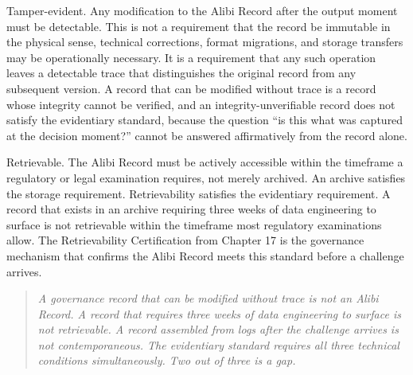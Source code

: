 Tamper-evident. Any modification to the Alibi Record after the output moment must be detectable. This is not a requirement that the record be immutable in the physical sense, technical corrections, format migrations, and storage transfers may be operationally necessary. It is a requirement that any such operation leaves a detectable trace that distinguishes the original record from any subsequent version. A record that can be modified without trace is a record whose integrity cannot be verified, and an integrity-unverifiable record does not satisfy the evidentiary standard, because the question ``is this what was captured at the decision moment?'' cannot be answered affirmatively from the record alone.

Retrievable. The Alibi Record must be actively accessible within the timeframe a regulatory or legal examination requires, not merely archived. An archive satisfies the storage requirement. Retrievability satisfies the evidentiary requirement. A record that exists in an archive requiring three weeks of data engineering to surface is not retrievable within the timeframe most regulatory examinations allow. The Retrievability Certification from Chapter 17 is the governance mechanism that confirms the Alibi Record meets this standard before a challenge arrives.

\begin{quote}
\emph{A governance record that can be modified without trace is not an Alibi Record. A record that requires three weeks of data engineering to surface is not retrievable. A record assembled from logs after the challenge arrives is not contemporaneous. The evidentiary standard requires all three technical conditions simultaneously. Two out of three is a gap.}
\end{quote}

